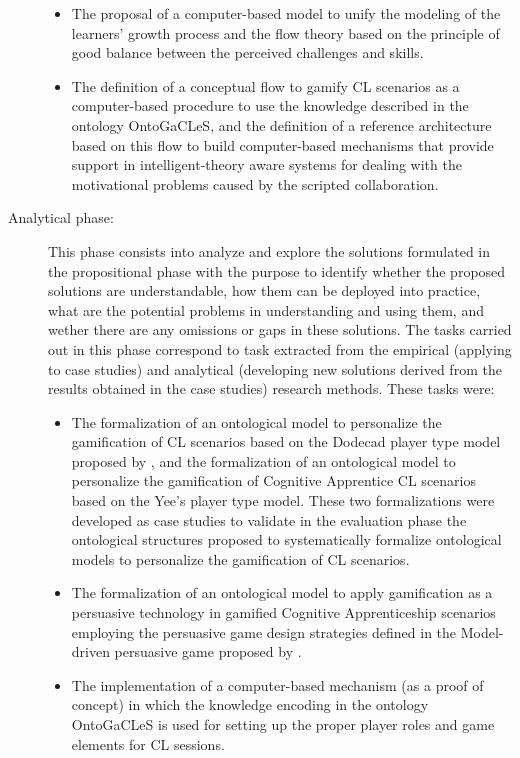 \begin{description}
\begin{itemize}
\item
The proposal of a computer-based model to unify the modeling of the learners' growth process and the flow theory based on the principle of good balance between the perceived challenges and skills.


\item
The definition of a conceptual flow to gamify CL scenarios as a computer-based procedure to use the knowledge described in the ontology OntoGaCLeS, and the definition of a reference architecture based on this flow to build computer-based mechanisms that provide support in intelligent-theory aware systems for dealing with the motivational problems caused by the scripted collaboration.
\end{itemize}

\item[Analytical phase:]
This phase consists into analyze and explore the solutions formulated in the propositional phase with the purpose to identify whether the proposed solutions are understandable, how them can be deployed into practice, what are the potential problems in understanding and using them, and wether there are any omissions or gaps in these solutions. The tasks carried out in this phase correspond to task extracted from the empirical (applying to case studies) and analytical (developing new solutions derived from the results obtained in the case studies) research methods. These tasks were:

\begin{itemize}
\item
The formalization of an ontological model to personalize the gamification of CL scenarios based on the Dodecad player type model proposed by , and the formalization of an ontological model to personalize the gamification of Cognitive Apprentice CL scenarios based on the Yee's player type model. These two formalizations were developed as case studies to validate in the evaluation phase the ontological structures proposed to systematically formalize ontological models to personalize the gamification of CL scenarios.

\item
The formalization of an ontological model to apply gamification as a persuasive technology in gamified Cognitive Apprenticeship scenarios employing the persuasive game design strategies defined in the Model-driven persuasive game proposed by .

\item
The implementation of a computer-based mechanism (as a proof of concept) in which the knowledge encoding in the ontology OntoGaCLeS is used for setting up the proper player roles and game elements for CL sessions.


\end{itemize}
\end{description}
